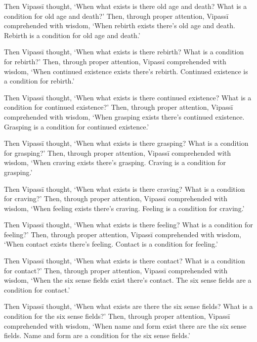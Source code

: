 \documentclass[12pt,openany]{book}%
\begin{document}
Then \textsanskrit{Vipassī} thought, ‘When what exists is there old age and death? What is a condition for old age and death?’ Then, through proper attention, \textsanskrit{Vipassī} comprehended with wisdom, ‘When rebirth exists there’s old age and death. Rebirth is a condition for old age and death.’ 

Then \textsanskrit{Vipassī} thought, ‘When what exists is there rebirth? What is a condition for rebirth?’ Then, through proper attention, \textsanskrit{Vipassī} comprehended with wisdom, ‘When continued existence exists there’s rebirth. Continued existence is a condition for rebirth.’ 

Then \textsanskrit{Vipassī} thought, ‘When what exists is there continued existence? What is a condition for continued existence?’ Then, through proper attention, \textsanskrit{Vipassī} comprehended with wisdom, ‘When grasping exists there’s continued existence. Grasping is a condition for continued existence.’ 

Then \textsanskrit{Vipassī} thought, ‘When what exists is there grasping? What is a condition for grasping?’ Then, through proper attention, \textsanskrit{Vipassī} comprehended with wisdom, ‘When craving exists there’s grasping. Craving is a condition for grasping.’ 

Then \textsanskrit{Vipassī} thought, ‘When what exists is there craving? What is a condition for craving?’ Then, through proper attention, \textsanskrit{Vipassī} comprehended with wisdom, ‘When feeling exists there’s craving. Feeling is a condition for craving.’ 

Then \textsanskrit{Vipassī} thought, ‘When what exists is there feeling? What is a condition for feeling?’ Then, through proper attention, \textsanskrit{Vipassī} comprehended with wisdom, ‘When contact exists there’s feeling. Contact is a condition for feeling.’ 

Then \textsanskrit{Vipassī} thought, ‘When what exists is there contact? What is a condition for contact?’ Then, through proper attention, \textsanskrit{Vipassī} comprehended with wisdom, ‘When the six sense fields exist there’s contact. The six sense fields are a condition for contact.’ 

Then \textsanskrit{Vipassī} thought, ‘When what exists are there the six sense fields? What is a condition for the six sense fields?’ Then, through proper attention, \textsanskrit{Vipassī} comprehended with wisdom, ‘When name and form exist there are the six sense fields. Name and form are a condition for the six sense fields.’ 
\end{document}
